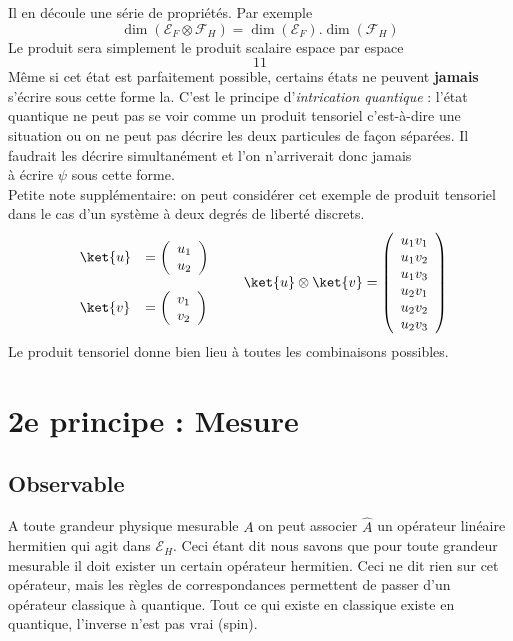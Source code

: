  Il en découle une série de propriétés. Par exemple
 \begin{equation}
 \dim(\mathcal{E}_F\otimes\mathcal{F}_H) = \dim(\mathcal{E}_F).
 \dim(\mathcal{F}_H)
 \end{equation}
 Le produit sera simplement le produit scalaire espace par espace
 \begin{equation}
 11
 \end{equation}
 Même si cet état est parfaitement possible, certains états ne peuvent 
 \textbf{jamais} s'écrire sous cette forme la. C'est le principe d'\textit{intrication 
 quantique }: l'état quantique ne peut pas se voir comme un produit 
 tensoriel c'est-à-dire une situation ou on ne peut pas décrire les deux particules 
 de façon séparées. Il faudrait les décrire simultanément et l'on n'arriverait donc jamais \\
 à écrire $\psi$ sous cette forme.\\
 
 Petite note supplémentaire: on peut considérer cet exemple de produit tensoriel dans 
 le cas d'un système à deux degrés de liberté discrets.
 \begin{equation}
 \begin{array}{ll}
 \ket{u} &= \left(\begin{array}{c}
 u_1\\
 u_2
 \end{array}\right)\\
 &\\
  \ket{v} &= \left(\begin{array}{c}
 v_1\\
 v_2
 \end{array}\right) 
 \end{array}\qquad \ket{u}\otimes\ket{v} = \left(\begin{array}{c}
 u_1v_1\\
 u_1v_2\\
 u_1v_3\\
 u_2v_1\\
 u_2v_2\\
 u_2v_3  
 \end{array}\right)
 \end{equation}
 Le produit tensoriel donne bien lieu à toutes les combinaisons possibles.
 
 
 \section{2e principe : Mesure}
 \subsection{Observable}
 A toute grandeur physique mesurable $A$ on peut associer $\hat{A}$ un 
 opérateur linéaire hermitien qui agit dans $\mathcal{E}_H$. Ceci étant dit 
 nous savons que pour toute grandeur mesurable il doit exister un certain opérateur
 hermitien. Ceci ne dit rien sur cet opérateur, mais les règles de 
 correspondances permettent de passer d'un opérateur classique à quantique. 
 Tout ce qui existe en classique existe en quantique, l'inverse n'est pas
 vrai (spin).
 
